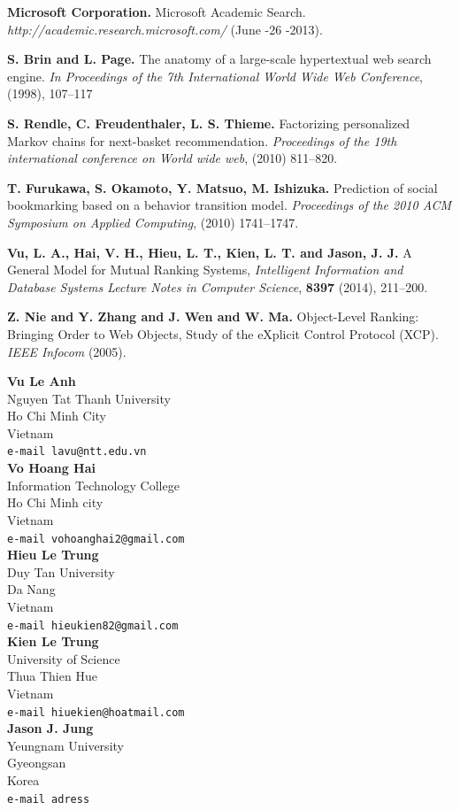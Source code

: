 \documentclass[10pt,leqno,twoside]{article}
\begin{document}
\begin{thebibliography}{99}
\textbf{Microsoft  Corporation.} 
Microsoft Academic Search. 
\textit{http://academic.research.microsoft.com/} (June -26 -2013).



\textbf{S. Brin and L. Page.}
The anatomy of a large-scale hypertextual web search engine.  
\textit{In Proceedings of the 7th International World Wide Web
Conference}, (1998), 107--117 



\textbf{S. Rendle, C. Freudenthaler, L. S. Thieme.} 
Factorizing personalized Markov chains for next-basket recommendation. 
\textit{Proceedings of the 19th international conference on World wide web}, (2010) 811--820.




\textbf{T. Furukawa, S. Okamoto, Y. Matsuo, M. Ishizuka.} 
Prediction of social bookmarking based on a behavior transition model. 
\textit{Proceedings of the 2010 ACM Symposium on Applied Computing}, (2010) 1741--1747.

\textbf{Vu, L. A., Hai, V. H., Hieu, L. T., Kien, L. T.  and Jason, J. J. }
A General Model for Mutual Ranking Systems,
\textit{Intelligent Information and Database Systems
Lecture Notes in Computer Science}, \textbf{8397} (2014), 211--200.


\textbf{Z. Nie and Y. Zhang and J. Wen and W. Ma.}
Object-Level Ranking: Bringing Order to Web Objects,
Study of the eXplicit Control Protocol (XCP). 
\textit{IEEE Infocom }(2005).


\end{thebibliography}
\vspace{2cm}

\noindent\textbf{Vu Le Anh}\\
Nguyen Tat Thanh University\\
Ho Chi Minh City\\
Vietnam\\
{\tt e-mail lavu@ntt.edu.vn}\\

\noindent\textbf{Vo Hoang Hai}\\
Information Technology College\\
Ho Chi Minh city\\
Vietnam\\
{\tt e-mail vohoanghai2@gmail.com}\\

\noindent\textbf{Hieu Le Trung}\\
Duy Tan University\\
Da Nang\\
Vietnam\\
{\tt e-mail hieukien82@gmail.com}\\

\noindent\textbf{Kien Le Trung}\\
University of Science\\
Thua Thien Hue\\
Vietnam\\
{\tt e-mail hiuekien@hoatmail.com}\\

\noindent\textbf{Jason J. Jung}\\
Yeungnam University\\
Gyeongsan\\
Korea\\
{\tt e-mail adress}
\end{document}
